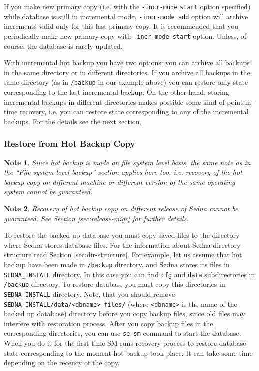 \documentclass[a4paper,12pt]{article}
\newtheorem{note}{Note}    %
\begin{document}
If you make new primary copy (i.e. with the \verb!-incr-mode! \verb!start!
option specified) while database is still in incremental mode,
\verb!-incr-mode add! option will archive increments valid only for this last
primary copy. It is recommended that you periodically make new primary copy with
\verb!-incr-mode start! option. Unless, of course, the database is rarely
updated.

With incremental hot backup you have two options: you can archive all backups in
the same directory or in different directories. If you archive all backups in
the same directory (as in \verb!/backup! in our example above) you can restore
only state corresponding to the last incremental backup. On the other hand,
storing incremental backups in different directories makes possible some kind of
point-in-time recovery, i.e. you can restore state corresponding to any of the
incremental backups. For the details see the next section.

\subsubsection*{Restore from Hot Backup Copy}

\begin{note}
Since hot backup is made on file system level basis, the same note as in the
``File system level backup'' section applies here too, i.e. recovery of the hot
backup copy on different machine or different version of the same operating
system cannot be guaranteed.
\end{note}

\begin{note}
Recovery of hot backup copy on different release of Sedna cannot be guaranteed.
See Section \ref{sec:release-migr} for further details.
\end{note}

To restore the backed up database you must copy saved files to the directory
where Sedna stores database files. For the information about Sedna directory
structure read Section \ref{sec:dir-structure}. For example, let us assume that
hot backup have been made in \verb!/backup! directory, and Sedna stores its
files in \verb!SEDNA_INSTALL! directory. In this case you can find \verb!cfg!
and \verb!data! subdirectories in \verb!/backup! directory. To restore database
you must copy this directories in \verb!SEDNA_INSTALL! directory. Note, that you
should remove \verb!SEDNA_INSTALL/data/<dbname>_files/! (where \verb!<dbname>!
is the name of the backed up database) directory before you copy backup files,
since old files may interfere with restoration process. After you copy backup
files in the corresponding directories, you can use \verb!se_sm! command to
start the database. When you do it for the first time SM runs recovery process
to restore database state corresponding to the moment hot backup took place. It
can take some time depending on the recency of the copy.
\end{document}
